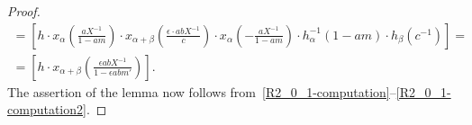 \documentclass[oneside, 8pt]{amsart}
\theoremstyle{remark}
\theoremstyle{definition}
\numberwithin{lemma}{section}
\numberwithin{prop}{section}
\numberwithin{corollary}{section}
\numberwithin{externaltheorem}{section}
\numberwithin{equation}{section}
\begin{document}
\begin{proof}
\begin{multline}
 = \left[ h\cdot x_\alpha\left(\tfrac{a X^{-1}}{1-am}\right) \cdot x_{\alpha + \beta}\left(\tfrac{\epsilon \cdot abX^{-1}}{c}\right)\cdot x_\alpha\left(-\tfrac{aX^{-1}}{1 - am}\right) \cdot h_{\alpha}^{-1}(1-am)\cdot h_{\beta}(c^{-1}) \right]   = \\ = \left[ h\cdot x_{\alpha + \beta}\left(\tfrac{\epsilon   abX^{-1}}{1 - \epsilon a b m'}\right) \right].\end{multline}
The assertion of the lemma now follows from~\eqref{R2_0_1-computation}--\eqref{R2_0_1-computation2}.
\end{proof}
\begin{comment}
In the sequel it will be convenient to have explicit formulas for the action of operators $T_\alpha(aX^{-1})$ and $T_\alpha(a + Xf)$ on $\overline{V}_T$. These formulas are the analogues of~\eqref{T_1}--\eqref{T_leq0} and are easily obtained from them using~\eqref{eq:VVT}.
\begin{align}\label{T_1-VT}
 T_\alpha(aX^{-1}) \cdot [p, h, u] &= [ S_\alpha(a, p),\ x_\alpha\left(\tfrac{aX^{-1}}{1+am}\right) \cdot h,\ u(1+am)],\text{ where }p\in P_\alpha(m); \\
 T_\alpha(a + Xf) \cdot [p, h, u] &= [x_\alpha(a + Xf) \cdot p \cdot x_\alpha(-a),\ x_\alpha(a) \cdot h, u]. \label{T_leq0-VT}
\end{align}
\end{comment}
\end{document}
